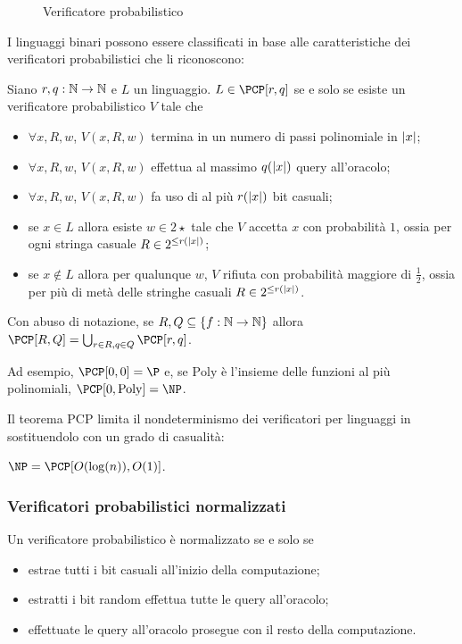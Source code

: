 \begin{figure}[ht]
	\centering
	
	\caption{Verificatore probabilistico}
	\label{fig:probcheck}
\end{figure}

I linguaggi binari possono essere classificati in base alle caratteristiche dei verificatori probabilistici che li riconoscono:
\begin{defin}
	Siano $r,q:\mathbb N\to\mathbb N$ e $L$ un linguaggio.
	$L\in\PCP[r,q]$ se e solo se esiste un verificatore probabilistico $V$ tale che
	\begin{itemize}
		\item $\forall x,R,w$, $V(x,R,w)$ termina in un numero di passi polinomiale in $|x|$;
		\item $\forall x,R,w$, $V(x,R,w)$ effettua al massimo $q(|x|)$ query all'oracolo;
		\item $\forall x,R,w$, $V(x,R,w)$ fa uso di al più $r(|x|)$ bit casuali;
		\item se $x\in L$ allora esiste $w\in 2\star$ tale che $V$ accetta $x$ con probabilità $1$, ossia per ogni stringa casuale $R\in 2^{\leq r(|x|)}$;
		\item se $x\notin L$ allora per qualunque $w$, $V$ rifiuta con probabilità maggiore di $\frac12$, ossia per più di metà delle stringhe casuali $R\in 2^{\leq r(|x|)}$.
	\end{itemize}
	Con abuso di notazione, se $R,Q\subseteq\left\{ f:\mathbb N\to\mathbb N \right\}$ allora $\PCP[R,Q]=\bigcup_{r\in R,q\in Q} \PCP[r,q]$.
\end{defin}
\noindent Ad esempio, $\PCP[0,0]=\P$ e, se $\mathrm{Poly}$ è l'insieme delle funzioni al più polinomiali, $\PCP[0,\mathrm{Poly}]=\NP$.

Il teorema PCP limita il nondeterminismo dei verificatori per linguaggi in \NP sostituendolo con un grado di casualità:
\begin{theorem}\label{thm:pcp}
	$\NP=\PCP[O(\log(n)),O(1)]$.
\end{theorem}


\subsubsection{Verificatori probabilistici normalizzati}
Un verificatore probabilistico è normalizzato se e solo se
\begin{itemize}
	\item estrae tutti i bit casuali all'inizio della computazione;
	\item estratti i bit random effettua tutte le query all'oracolo;
	\item effettuate le query all'oracolo prosegue con il resto della computazione.
\end{itemize}

